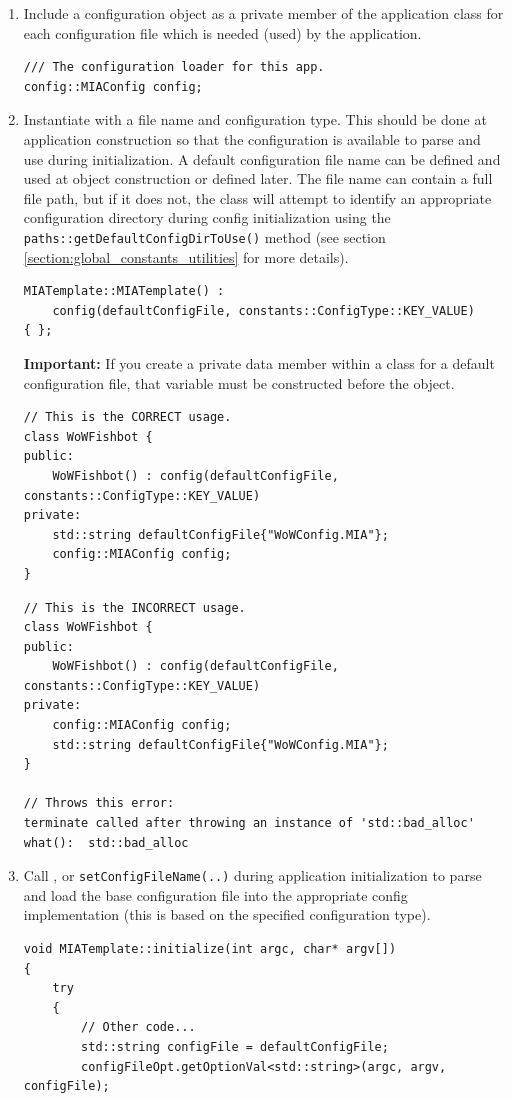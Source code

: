 \begin{enumerate}
	\item Include a configuration object as a private member of the application class for each configuration file which is needed (used) by the application.
	\begin{lstlisting}[style=cppstyle]
/// The configuration loader for this app.
config::MIAConfig config;
	\end{lstlisting}
	\item Instantiate  with a file name and configuration type. This should be done at application construction so that the configuration is available to parse and use during initialization. A default configuration file name can be defined and used at object construction or defined later. The file name can contain a full file path, but if it does not, the  class will attempt to identify an appropriate configuration directory during config initialization using the \texttt{paths::getDefaultConfigDirToUse()} method (see section \ref{section:global_constants_utilities} for more details).
	\begin{lstlisting}[style=cppstyle]
MIATemplate::MIATemplate() : 
	config(defaultConfigFile, constants::ConfigType::KEY_VALUE)                      
{ };
	\end{lstlisting}
	\textbf{Important:} If you create a private data member within a class for a default configuration file, that variable must be constructed before the  object.
	\begin{lstlisting}[style=cppstyle]
// This is the CORRECT usage.
class WoWFishbot {
public:
	WoWFishbot() : config(defaultConfigFile, constants::ConfigType::KEY_VALUE)
private:
	std::string defaultConfigFile{"WoWConfig.MIA"};
	config::MIAConfig config;
}
	\end{lstlisting}
	\begin{lstlisting}[style=cppstyle]
// This is the INCORRECT usage.
class WoWFishbot {
public:
	WoWFishbot() : config(defaultConfigFile, constants::ConfigType::KEY_VALUE)
private:
	config::MIAConfig config;
	std::string defaultConfigFile{"WoWConfig.MIA"};
}

// Throws this error:
terminate called after throwing an instance of 'std::bad_alloc'
what():  std::bad_alloc
	\end{lstlisting}
	\item Call ,  or \texttt{setConfigFileName(..)} during application initialization to parse and load the base configuration file into the appropriate config implementation (this is based on the specified configuration type).
	\begin{lstlisting}[style=cppstyle]
void MIATemplate::initialize(int argc, char* argv[])
{
	try
	{    
		// Other code...
		std::string configFile = defaultConfigFile;
		configFileOpt.getOptionVal<std::string>(argc, argv, configFile);


\end{lstlisting}
\end{enumerate}
